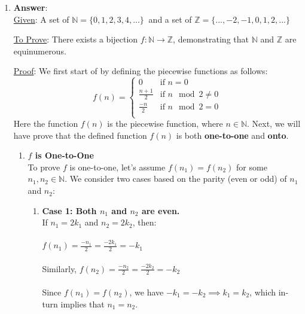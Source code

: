 \documentclass[11pt]{article}
\begin{document}
\begin{enumerate}
\begin{tcolorbox}
\begin{center}
        \end{center}
        \end{tcolorbox}

    \item \textbf{Answer}:\\
    \uline{Given}: A set of $\mathbb{N} = \{0,1,2,3,4,...\}\ $ and a set of $\mathbb{Z} = \{...,-2,-1,0,1,2,...\}\ $

    \uline{To Prove}: There exists a bijection $ f: \mathbb{N} \rightarrow \mathbb{Z} $, demonstrating that $ \mathbb{N} $ and $ \mathbb{Z} $ are equinumerous.

    \uline{Proof}:
    We first start of by defining the piecewise functions as follows:\\
    \[
        f(n) =
        \begin{cases} 
                0 & \text{if } n = 0 \\
                \frac{n+1}{2} & \text{if } n\mod2\neq 0\\
                \frac{-n}{2} & \text{if } n\mod2=0\\
        \end{cases}
    \]
    Here the function $f(n)$ is the piecewise function, where $n \in \mathbb{N}$.
    Next, we will have prove that the defined function $f(n)$ is both \textbf{one-to-one} and \textbf{onto}.

\begin{enumerate}
    \item \textbf{$ f $ is One-to-One} \\
To prove $ f $ is one-to-one, let's assume $ f(n_1) = f(n_2) $ for some $ n_1, n_2 \in \mathbb{N} $.  
We consider two cases based on the parity (even or odd) of $ n_1 $ and $ n_2 $:

\begin{enumerate}
    \item \textbf{Case 1: Both $ n_1 $ and $ n_2 $ are even.} \\
If $ n_1 = 2k_1 $ and $ n_2 = 2k_2 $, then: \\
\\
$f(n_1) = \frac{-n_1}{2} = \frac{-2k_1}{2} = -k_1$ \\
\\
Similarly, $f(n_2) = \frac{-n_2}{2} = \frac{-2k_2}{2} = -k_2$\\
\\
Since $ f(n_1) = f(n_2) $, we have $-k_1 = -k_2 \implies k_1 = k_2$, which in-turn implies that $n_1 = n_2$. \\


\end{enumerate}
\end{enumerate}
\end{enumerate}
\end{document}
